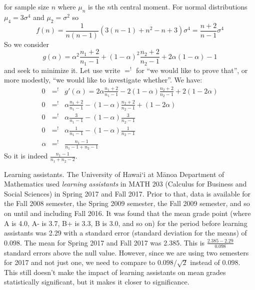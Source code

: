 for sample size $n$ where $\mu_n$ is the $n$th central moment. For normal distributions $\mu_4=3\sigma^4$ and $\mu_2=\sigma^2$ so
\[
	f(n) = \frac{1}{n(n-1)}(3(n-1)+n^2-n+3)\sigma^4 = \frac{n+2}{n-1}\sigma^4
\]
So we consider
\[
	g(\alpha) = \alpha^2\frac{n_1+2}{n_1-1} + (1-\alpha)^2 \frac{n_2+2}{n_2-1} + 2\alpha(1-\alpha) - 1
\]
and seek to minimize it.
Let use write $=^!$ for ``we would like to prove that'', or more modestly, ``we would like to investigate whether''.
We have:
\begin{eqnarray*}
	0 &=^!& g'(\alpha) = 2\alpha\frac{n_1+2}{n_1-1} - 2(1-\alpha) \frac{n_2+2}{n_2-1} + 2(1-2\alpha)\\
	0 &=^!& \alpha\frac{n_1+2}{n_1-1} - (1-\alpha) \frac{n_2+2}{n_2-1} + (1-2\alpha)\\
	0 &=^!& \alpha\frac{3}{n_1-1} - (1-\alpha) \frac{3}{n_2-1}\\
	0 &=^!& \alpha\frac{1}{n_1-1} - (1-\alpha) \frac{1}{n_2-1}\\
	\alpha &=^!& \frac{n_1-1}{n_1-1+n_2-1}
\end{eqnarray*}
So it is indeed $\frac{n_1-1}{n_1+n_2-2}$.


\begin{example}{Learning assistants.}%
	The University of Hawai\textquoteleft i at M\=anoa Department of Mathematics used \emph{learning assistants}
	in MATH 203 (Calculus for Business and Social Sciences) in Spring 2017 and Fall 2017.
	Prior to that, data is available for the Fall 2008 semester, the Spring 2009 semester, the Fall 2009 semester, and so on until and including Fall 2016.
	It was found that the mean grade point (where A is 4.0, A- is 3.7, B+ is 3.3, B is 3.0, and so on)
	for the period before learning assistants was 2.29 with a standard error (standard deviation for the means) of 0.098.
	The mean for Spring 2017 and Fall 2017 was 2.385. This is $\frac{2.385-2.29}{0.098}$ standard errors above the null value.
	However, since we are using two semesters for 2017 and not just one, we need to compare to $0.098/\sqrt{2}$ instead of $0.098$.
	This still doesn't make the impact of learning assistants on mean grades statistically significant, but it makes it closer to significance.
\end{example}